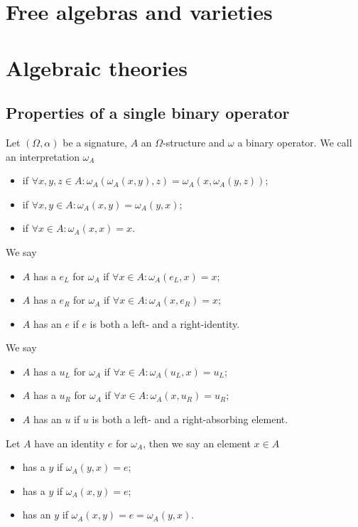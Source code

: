 \section{Free algebras and varieties}

\section{Algebraic theories}
\subsection{Properties of a single binary operator}
\begin{definition}
Let $(\Omega, \alpha)$ be a signature, $A$ an $\Omega$-structure and $\omega$ a binary operator. We call an interpretation $\omega_A$
\begin{itemize}
\item {} if $\forall x,y,z\in A: \omega_A(\omega_A(x,y),z) = \omega_A(x,\omega_A(y,z))$;
\item {} if $\forall x,y\in A: \omega_A(x,y) = \omega_A(y,x)$;
\item {} if $\forall x\in A: \omega_A(x,x) = x$.
\end{itemize}
We say
\begin{itemize}
\item $A$ has a  $e_L$ for $\omega_A$ if $\forall x\in A: \omega_A(e_L, x) = x$;
\item $A$ has a  $e_R$ for $\omega_A$ if $\forall x\in A: \omega_A(x, e_R) = x$;
\item $A$ has an  $e$ if $e$ is both a left- and a right-identity.
\end{itemize}
We say
\begin{itemize}
\item $A$ has a  $u_L$ for $\omega_A$ if $\forall x\in A: \omega_A(u_L, x) = u_L$;
\item $A$ has a  $u_R$ for $\omega_A$ if $\forall x\in A: \omega_A(x, u_R) = u_R$;
\item $A$ has an  $u$ if $u$ is both a left- and a right-absorbing element.
\end{itemize}
Let $A$ have an identity $e$ for $\omega_A$, then we say an element $x\in A$
\begin{itemize}
\item has a  $y$ if $\omega_A(y,x) = e$;
\item has a  $y$ if $\omega_A(x,y) = e$;
\item has an  $y$ if $\omega_A(x,y) = e = \omega_A(y,x)$.
\end{itemize}
\end{definition}

